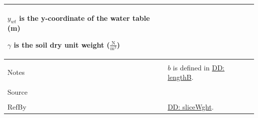 \documentclass[12pt]{article}
\begin{document}
\begin{minipage}{\textwidth}
\begin{tabular}{p{} p{}}
\begin{symbDescription}
                                                  \item{${y_{wt}}$ is the y-coordinate of the water table (m)}
                                                  \item{$γ$ is the soil dry unit weight ($\frac{\text{N}}{\text{m}^{3}}$)}
                                                  \end{symbDescription}
                                                  \\ \midrule \\
                                                  Notes & $b$ is defined in \hyperref[DD:lengthB]{DD: lengthB}.
                                                          \\ \midrule \\
                                                          Source & \cite{fredlund1977}
                                                                   \\ \midrule \\
                                                                   RefBy & \hyperref[DD:sliceWght]{DD: sliceWght}.
\\ \bottomrule \end{tabular}
\end{minipage}
\par~
\end{document}
